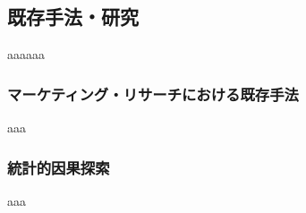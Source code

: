 
\subsection{既存手法・研究}

aaaaaa

\subsubsection{マーケティング・リサーチにおける既存手法}

aaa

\subsubsection{統計的因果探索}

aaa
